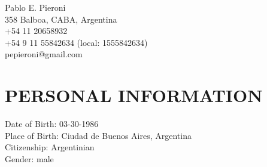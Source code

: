 \documentclass[letterpaper]{article}
\def\name{Pablo E. Pieroni}
\begin{document}
\begin{flushright}
{\huge \name}\\
   358 Balboa, CABA, Argentina\\
   +54 11 20658932 \\
   +54 9 11 55842634 (local: 1555842634)\\
   pepieroni@gmail.com
\end{flushright}

\vspace{0.25in}



\section*{PERSONAL INFORMATION}
   Date of Birth: 03-30-1986\\
   Place of Birth: Ciudad de Buenos Aires, Argentina\\
   Citizenship: Argentinian\\
   Gender: male
\end{document}
